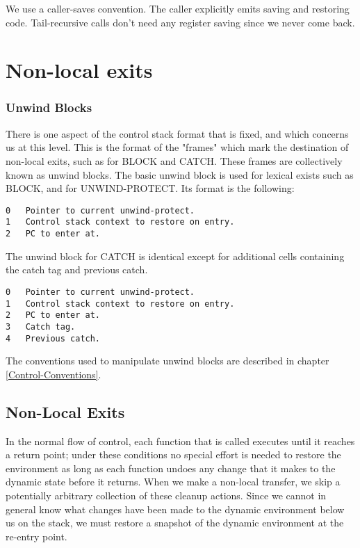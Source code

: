 {\begin{itemize, spread 0, spacing 1}
We use a caller-saves convention.  The caller explicitly emits saving and
restoring code.  Tail-recursive calls don't need
any register saving since we never come back.



\chapter{Non-local exits}


\subsection{Unwind Blocks}

There is one aspect of the control stack format that is fixed, and which
concerns us at this level.  This is the format of the "frames" which mark the
destination of non-local exits, such as for BLOCK and CATCH.  These frames are
collectively known as unwind blocks.  The basic unwind block is used for
lexical exists such as BLOCK, and for UNWIND-PROTECT.  Its format is the
following:
\begin{verbatim}
0   Pointer to current unwind-protect.
1   Control stack context to restore on entry.
2   PC to enter at.
\end{verbatim}

The unwind block for CATCH is identical except for additional cells
containing the catch tag and previous catch.
\begin{verbatim}
0   Pointer to current unwind-protect.
1   Control stack context to restore on entry.
2   PC to enter at.
3   Catch tag.
4   Previous catch.
\end{verbatim}

The conventions used to manipulate unwind blocks are described in chapter
\ref{Control-Conventions}.



\section{Non-Local Exits}
\label{Catch}

In the normal flow of control, each function that is called executes until it
reaches a return point; under these conditions no special effort is needed to
restore the environment as long as each function undoes any change that it
makes to the dynamic state before it returns.  When we make a non-local
transfer, we skip a potentially arbitrary collection of these cleanup actions.
Since we cannot in general know what changes have been made to the dynamic
environment below us on the stack, we must restore a snapshot of the dynamic
environment at the re-entry point.


\end{itemize, spread 0, spacing 1}}

